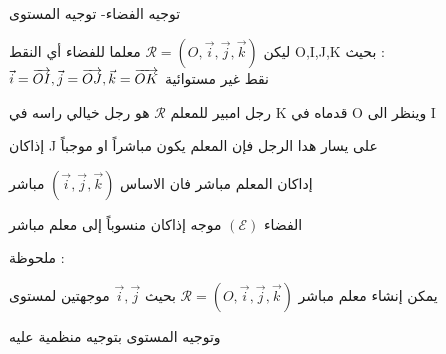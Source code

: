 \begin{frame}{توجيه الفضاء-  توجيه المستوى }
\begin{minipage} {.75\textwidth}
	

	\begin{small}
		\begin{block}{}
			
		

	ليكن 
	 $\mathcal{R}=(O,\vec{i},\vec{j},\vec{k})$
	 معلما للفضاء أي النقط 
	O,I,J,K 
	 بحيث : \\
	$\vec{i}=\overrightarrow{OI},\vec{j}=\overrightarrow{OJ}, \vec{k}=\overrightarrow{OK}$ 
	نقط غير مستوائية 
	
	رجل امبير للمعلم 
	 $\mathcal{R}$ 
	 هو رجل خيالي راسه في K قدماه في O  وينظر الى I 
	 
	إذاكان J   على يسار هدا الرجل فإن المعلم  يكون مباشراً او موجباً
	
	إداكان المعلم  مباشر فان الاساس
	 	 $(\vec{i},\vec{j},\vec{k})$
	 	 مباشر
	 	 
	الفضاء 
	$(\mathcal{E})$
	 موجه إذاكان منسوباً إلى معلم مباشر
	 
	ملحوظة :
	
	‫يمكن إنشاء  معلم ‬مباشر 
		 $\mathcal{R}=(O,\vec{i},\vec{j},\vec{k})$ 
		  بحيث‬‬ 
$ 	\vec{i},\vec{j} $
	موجهتين  لمستوى 

	وتوجيه المستوى بتوجيه منظمية عليه 
\end{block}


%
\end{small}
\end{minipage}
\end{frame}
